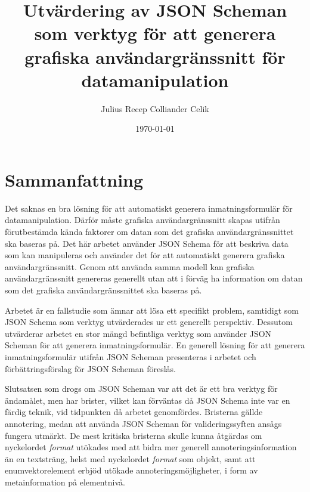 \documentclass[10pt,a4paper,titlepage,twoside]{report}
\begin{document}
\title{Utvärdering av JSON Scheman som verktyg för att generera grafiska användargränssnitt för datamanipulation}
\author{Julius Recep Colliander Celik}
\date{\today}

\frontmatter


\maketitle
\cleardoublepage
\newpage\leavevmode\thispagestyle{empty}
\newpage\leavevmode\thispagestyle{empty}

\setlength{\parindent}{0pt}

\setlength{\parskip}{\baselineskip}

\section*{Sammanfattning}
Det saknas en bra lösning för att automatiskt generera inmatningsformulär för datamanipulation. Därför måste grafiska användargränssnitt skapas utifrån förutbestämda kända faktorer om datan som det grafiska användargränssnittet ska baseras på. Det här arbetet använder JSON Schema för att beskriva data som kan manipuleras och använder det för att automatiskt generera grafiska användargränssnitt. Genom att använda samma modell kan grafiska användargränssnitt genereras generellt utan att i förväg ha information om datan som det grafiska användargränssnittet ska baseras på.

Arbetet är en fallstudie som ämnar att lösa ett specifikt problem, samtidigt som JSON Schema som verktyg utvärderades ur ett generellt perspektiv. Dessutom utvärderar arbetet en stor mängd befintliga verktyg som använder JSON Scheman för att generera inmatningsformulär. En generell lösning för att generera inmatningsformulär utifrån JSON Scheman presenteras i arbetet och förbättringsförslag för JSON Scheman föreslås. 

Slutsatsen som drogs om JSON Scheman var att det är ett bra verktyg för ändamålet, men har brister, vilket kan förväntas då JSON Schema inte var en färdig teknik, vid tidpunkten då arbetet genomfördes. Bristerna gällde annotering, medan att använda JSON Scheman för valideringssyften ansågs fungera utmärkt. De mest kritiska bristerna skulle kunna åtgärdas om nyckelordet \textit{format} utökades med att bidra mer generell annoteringsinformation än en textsträng, helst med nyckelordet \textit{format} som objekt, samt att enumvektorelement erbjöd utökade annoteringsmöjligheter, i form av metainformation på elementnivå.
\end{document}

